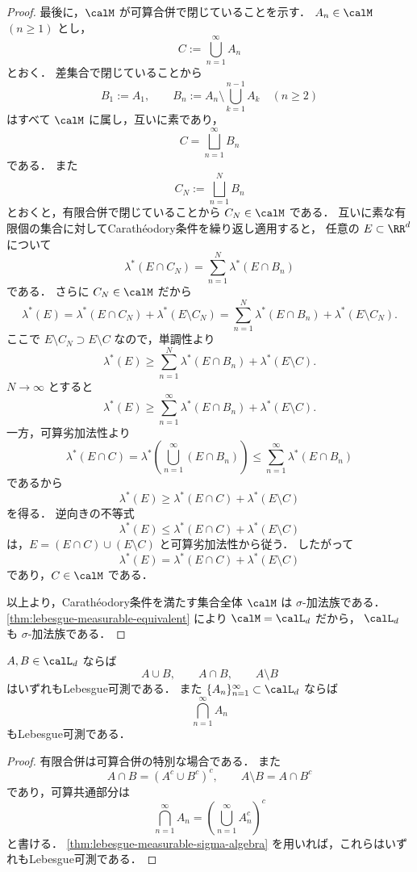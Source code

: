 \begin{proof}
最後に，$\calM$ が可算合併で閉じていることを示す．
$A_n\in\calM$ $(n\ge1)$ とし，
\[
C:=\bigcup_{n=1}^{\infty}A_n
\]
とおく．
差集合で閉じていることから
\[
B_1:=A_1,\qquad
B_n:=A_n\setminus\bigcup_{k=1}^{n-1}A_k\quad(n\ge2)
\]
はすべて $\calM$ に属し，互いに素であり，
\[
C=\bigsqcup_{n=1}^{\infty}B_n
\]
である．
また
\[
C_N:=\bigsqcup_{n=1}^{N}B_n
\]
とおくと，有限合併で閉じていることから $C_N\in\calM$ である．
互いに素な有限個の集合に対してCarathéodory条件を繰り返し適用すると，
任意の $E\subset\RR^d$ について
\[
\lambda^*(E\cap C_N)
=
\sum_{n=1}^{N}\lambda^*(E\cap B_n)
\]
である．
さらに $C_N\in\calM$ だから
\[
\lambda^*(E)
=
\lambda^*(E\cap C_N)+\lambda^*(E\setminus C_N)
=
\sum_{n=1}^{N}\lambda^*(E\cap B_n)+\lambda^*(E\setminus C_N).
\]
ここで $E\setminus C_N\supset E\setminus C$ なので，単調性より
\[
\lambda^*(E)
\ge
\sum_{n=1}^{N}\lambda^*(E\cap B_n)+\lambda^*(E\setminus C).
\]
$N\to\infty$ とすると
\[
\lambda^*(E)
\ge
\sum_{n=1}^{\infty}\lambda^*(E\cap B_n)+\lambda^*(E\setminus C).
\]
一方，可算劣加法性より
\[
\lambda^*(E\cap C)
=
\lambda^*\left(\bigcup_{n=1}^{\infty}(E\cap B_n)\right)
\le
\sum_{n=1}^{\infty}\lambda^*(E\cap B_n)
\]
であるから
\[
\lambda^*(E)
\ge
\lambda^*(E\cap C)+\lambda^*(E\setminus C)
\]
を得る．
逆向きの不等式
\[
\lambda^*(E)
\le
\lambda^*(E\cap C)+\lambda^*(E\setminus C)
\]
は，$E=(E\cap C)\cup(E\setminus C)$ と可算劣加法性から従う．
したがって
\[
\lambda^*(E)
=
\lambda^*(E\cap C)+\lambda^*(E\setminus C)
\]
であり，$C\in\calM$ である．

以上より，Carathéodory条件を満たす集合全体 $\calM$ は
$\sigma$-加法族である．
\cref{thm:lebesgue-measurable-equivalent} により $\calM=\calL_d$ だから，
$\calL_d$ も $\sigma$-加法族である．
\end{proof}

\begin{corollary}[集合演算]
\label{cor:lebesgue-measurable-set-operations}
$A,B\in\calL_d$ ならば
\[
A\cup B,\qquad A\cap B,\qquad A\setminus B
\]
はいずれもLebesgue可測である．
また $\{A_n\}_{n=1}^{\infty}\subset\calL_d$ ならば
\[
\bigcap_{n=1}^{\infty}A_n
\]
もLebesgue可測である．
\end{corollary}
\begin{proof}
有限合併は可算合併の特別な場合である．
また
\[
A\cap B=(A^c\cup B^c)^c,
\qquad
A\setminus B=A\cap B^c
\]
であり，可算共通部分は
\[
\bigcap_{n=1}^{\infty}A_n
=
\left(\bigcup_{n=1}^{\infty}A_n^c\right)^c
\]
と書ける．
\cref{thm:lebesgue-measurable-sigma-algebra} を用いれば，これらはいずれもLebesgue可測である．
\end{proof}

